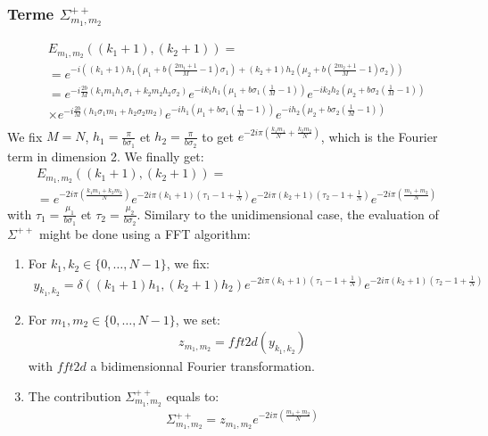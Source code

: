 \subsubsection{Terme $\Sigma_{m_1,m_2}^{++}$}
\begin{align*}
&E_{m_1,m_2}((k_1+1),(k_2+1))=\\
&=e^{-i\left((k_1+1)h_1\left(\mu_1+b\left(\frac{2m_1+1}{M}-1\right)\sigma_1\right)+(k_2+1)h_2\left(\mu_2+b\left(\frac{2m_2+1}{M}-1\right)\sigma_2\right)\right)}\\
&=e^{-i\frac{2b}{M}\left(k_1m_1h_1\sigma_1+k_2m_2h_2\sigma_2\right)}e^{-ik_1h_1\left(\mu_1+b\sigma_1\left(\frac{1}{M}-1\right)\right)}e^{-ik_2h_2\left(\mu_2+b\sigma_2\left(\frac{1}{M}-1\right)\right)}\\
&\times e^{-i\frac{2b}{M}\left(h_1\sigma_1 m_1+h_2\sigma_2 m_2\right)}e^{-ih_1\left(\mu_1+b\sigma_1\left(\frac{1}{M}-1\right)\right)}e^{-ih_2\left(\mu_2+b\sigma_2\left(\frac{1}{M}-1\right)\right)}\\
\end{align*}
We fix $M=N$, $h_1=\frac{\pi}{b\sigma_1}$ et $h_2=\frac{\pi}{b\sigma_2}$ to get $e^{-2i\pi\left(\frac{k_1m_1}{N}+\frac{k_2m_2}{N}\right)}$, which is the Fourier term in dimension 2. We finally get:
\begin{align*}
&E_{m_1,m_2}((k_1+1),(k_2+1))=\\
&=e^{-2i\pi\left(\frac{k_1m_1+k_2m_2}{N}\right)}e^{-2i\pi (k_1+1)\left(\tau_1-1+\frac{1}{N}\right)}e^{-2i\pi (k_2+1)\left(\tau_2-1+\frac{1}{N}\right)}e^{-2i\pi\left(\frac{m_1+m_2}{N}\right)}
\end{align*}
with $\tau_1=\frac{\mu_1}{b\sigma_1}$ et $\tau_2=\frac{\mu_2}{b\sigma_2}$.
Similary to the unidimensional case, the evaluation of $\Sigma^{++}$ might be done using a FFT algorithm:
\begin{enumerate}
\item For $k_1,k_2\in\{0,\hdots,N-1\}$, we fix:
\begin{align*}
y_{k_1,k_2}=\delta((k_1+1)h_1,(k_2+1)h_2)e^{-2i\pi (k_1+1)\left(\tau_1-1+\frac{1}{N}\right)}e^{-2i\pi (k_2+1)\left(\tau_2-1+\frac{1}{N}\right)}
\end{align*}
\item For $m_1,m_2\in\{0,\hdots,N-1\}$, we set:
\begin{align*}
  z_{m_1,m_2}=fft2d(y_{k_1,k_2})
\end{align*}
with $fft2d$ a bidimensionnal Fourier transformation.
\item The contribution $\Sigma_{m_1,m_2}^{++}$ equals to:
\begin{align*}
  \Sigma_{m_1,m_2}^{++}=z_{m_1,m_2}e^{-2i\pi\left(\frac{m_1+m_2}{N}\right)}
\end{align*}
\end{enumerate}

